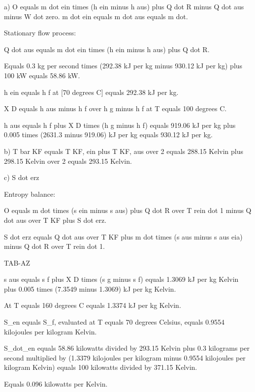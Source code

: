 a) O equals m dot ein times (h ein minus h aus) plus Q dot R minus Q dot aus minus W dot zero. m dot ein equals m dot aus equals m dot.

Stationary flow process:

Q dot aus equals m dot ein times (h ein minus h aus) plus Q dot R.

Equals 0.3 kg per second times (292.38 kJ per kg minus 930.12 kJ per kg) plus 100 kW equals 58.86 kW.

h ein equals h f at [70 degrees C] equals 292.38 kJ per kg.

X D equals h aus minus h f over h g minus h f at T equals 100 degrees C.

h aus equals h f plus X D times (h g minus h f) equals 919.06 kJ per kg plus 0.005 times (2631.3 minus 919.06) kJ per kg equals 930.12 kJ per kg.

b) T bar KF equals T KF, ein plus T KF, aus over 2 equals 288.15 Kelvin plus 298.15 Kelvin over 2 equals 293.15 Kelvin.

c) S dot erz

Entropy balance:

O equals m dot times (s ein minus s aus) plus Q dot R over T rein dot 1 minus Q dot aus over T KF plus S dot erz.

S dot erz equals Q dot aus over T KF plus m dot times (s aus minus s aus eia) minus Q dot R over T rein dot 1.

TAB-AZ

s aus equals s f plus X D times (s g minus s f) equals 1.3069 kJ per kg Kelvin plus 0.005 times (7.3549 minus 1.3069) kJ per kg Kelvin.

At T equals 160 degrees C equals 1.3374 kJ per kg Kelvin.

S_en equals S_f, evaluated at T equals 70 degrees Celsius, equals 0.9554 kilojoules per kilogram Kelvin.

S_dot_en equals 58.86 kilowatts divided by 293.15 Kelvin plus 0.3 kilograms per second multiplied by (1.3379 kilojoules per kilogram minus 0.9554 kilojoules per kilogram Kelvin) equals 100 kilowatts divided by 371.15 Kelvin.

Equals 0.096 kilowatts per Kelvin.